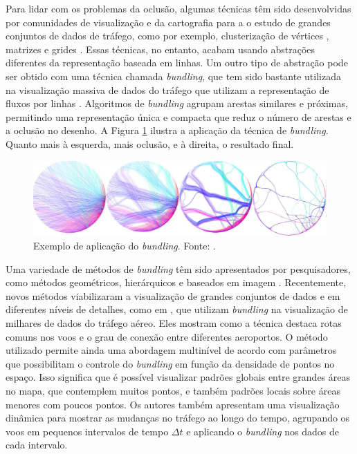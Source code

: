   Para lidar com os problemas da oclusão, algumas técnicas têm sido
desenvolvidas por comunidades de visualização e da cartografia para a o estudo
de grandes conjuntos de dados de tráfego, como por exemplo, clusterização de
vértices \citep{Schaeffer2007, Andrienko2011}, matrizes \citep{Elmqvist2008}
e grides \citep{JoWood2010}. Essas técnicas, no entanto, acabam usando
abstrações diferentes da representação baseada em linhas. Um outro tipo de
abstração pode ser obtido com uma técnica chamada \emph{bundling}, que tem sido
bastante utilizada na visualização massiva de dados do tráfego que utilizam a
representação de fluxos por linhas \citep{Zhou2013}. Algoritmos de
\emph{bundling} agrupam arestas similares e próximas, permitindo uma
representação única e compacta que reduz o número de arestas e a oclusão no
desenho. A Figura \ref{fig:exemplo-bund} ilustra a aplicação da técnica de
\emph{bundling}.  Quanto mais à esquerda, mais oclusão, e à direita, o
resultado final.

\begin{figure}[!htb]
  \centering
  \includegraphics[width=1\textwidth]{../figuras/bundle-ex.png}
\caption[Exemplo de aplicação do \emph{bundling}]{Exemplo de aplicação do \emph{bundling}. Fonte: \citet{Hurter2012}.}
  \label{fig:exemplo-bund}
\end{figure}

  Uma variedade de métodos de \emph{bundling} têm sido apresentados por
pesquisadores, como métodos geométricos, hierárquicos e baseados em imagem
\citep{Lhuillier2017}. Recentemente, novos métodos viabilizaram a visualização
de grandes conjuntos de dados e em diferentes níveis de detalhes, como em
\citet{Klein2014}, que utilizam \emph{bundling} na visualização de milhares de
dados do tráfego aéreo. Eles mostram como a técnica destaca rotas comuns nos
voos e o grau de conexão entre diferentes aeroportos. O método utilizado
permite ainda uma abordagem multinível de acordo com parâmetros que
possibilitam o controle do \emph{bundling} em função da densidade de pontos no
espaço. Isso significa que é possível visualizar padrões globais entre grandes
áreas no mapa, que contemplem muitos pontos, e também padrões locais sobre
áreas menores com poucos pontos. Os autores também apresentam uma visualização
dinâmica para mostrar as mudanças no tráfego ao longo do tempo, agrupando os
voos em pequenos intervalos de tempo $\Delta t$ e aplicando o \emph{bundling}
nos dados de cada intervalo.

